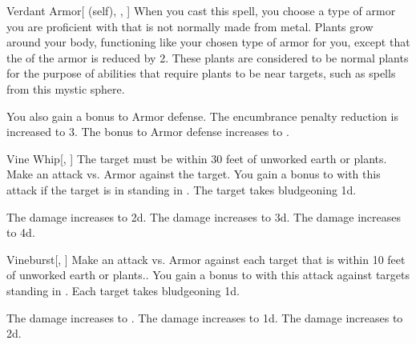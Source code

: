 \lowercase{\hypertarget{spell:Verdant Armor}{}}\label{spell:Verdant Armor}
\begin{attuneability}[Rank 1]{\hypertarget{spell:Verdant Armor}{Verdant Armor}}[ (self), , ]
When you cast this spell, you choose a type of armor you are proficient with that is not normally made from metal.
Plants grow around your body, functioning like your chosen type of armor for you, except that the  of the armor is reduced by 2.
These plants are considered to be normal plants for the purpose of abilities that require plants to be near targets, such as spells from this mystic sphere.

\rankline
{} You also gain a  bonus to Armor defense.
 The encumbrance penalty reduction is increased to 3.
 The bonus to Armor defense increases to .

\end{attuneability}
\vspace{0.25em}



\lowercase{\hypertarget{spell:Vine Whip}{}}\label{spell:Vine Whip}
\begin{freeability}[Rank 1]{\hypertarget{spell:Vine Whip}{Vine Whip}}[, ]
The target must be within 30 feet of unworked earth or plants.
Make an attack vs. Armor against the target.
You gain a  bonus to  with this attack if the target is in standing in .
\hit The target takes bludgeoning  \plus1d.

\rankline
{} The damage increases to  \plus2d.
 The damage increases to  \plus3d.
 The damage increases to  \plus4d.

\end{freeability}
\vspace{0.25em}



\lowercase{\hypertarget{spell:Vineburst}{}}\label{spell:Vineburst}
\begin{freeability}[Rank 1]{\hypertarget{spell:Vineburst}{Vineburst}}[, ]
Make an attack vs. Armor against each target that is within 10 feet of unworked earth or plants..
You gain a  bonus to  with this attack against targets standing in .
\hit Each target takes bludgeoning  \minus1d.

\rankline
{} The damage increases to .
 The damage increases to  \plus1d.
 The damage increases to  \plus2d.

\end{freeability}
\vspace{0.25em}



